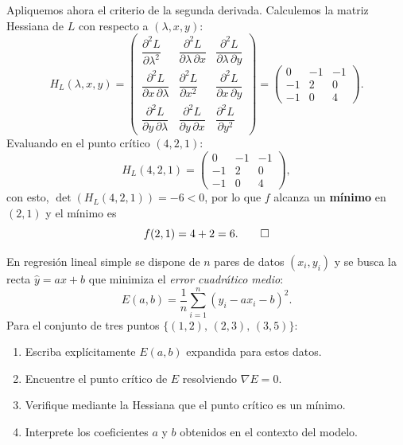 \documentclass[11pt,respuestas,a4]{aleph-examen}
\begin{document}
\begin{preguntas}
\begin{respuesta}
Apliquemos ahora el criterio de la segunda derivada. Calculemos la matriz Hessiana de $L$ con respecto a $(\lambda, x, y)$:
\[
    H_L(\lambda,x,y)
    =
    \begin{pmatrix}
        \dfrac{\partial^2 L}{\partial \lambda^2} & \dfrac{\partial^2 L}{\partial \lambda\,\partial x} & \dfrac{\partial^2 L}{\partial \lambda\,\partial y}\\[10pt]
        \dfrac{\partial^2 L}{\partial x\,\partial \lambda} & \dfrac{\partial^2 L}{\partial x^2} & \dfrac{\partial^2 L}{\partial x\,\partial y}\\[10pt]
        \dfrac{\partial^2 L}{\partial y\,\partial \lambda} & \dfrac{\partial^2 L}{\partial y\,\partial x} & \dfrac{\partial^2 L}{\partial y^2}
    \end{pmatrix}
    =
    \begin{pmatrix}
        0 & -1 & -1\\
        -1 & 2 & 0\\
        -1 & 0 & 4
    \end{pmatrix}.
\]
Evaluando en el punto crítico $(4,2,1)$:
\[
    H_L(4,2,1)
    =
    \begin{pmatrix}
        0 & -1 & -1\\
        -1 & 2 & 0\\
        -1 & 0 & 4
    \end{pmatrix},
\]
con esto, $\det(H_L(4,2,1)) = -6 < 0$, por lo que $f$ alcanza un \textbf{mínimo} en $(2,1)$ y el mínimo es
\[
    f(2,1) = 4 + 2 = 6.\qedhere
\]
\end{respuesta}


\item
En regresión lineal simple se dispone de $n$ pares de datos $(x_i, y_i)$ y se busca la recta $\hat{y} = ax + b$ que minimiza el \emph{error cuadrático medio}:
\[
    E(a,b)
    =
    \frac{1}{n}\sum_{i=1}^{n}(y_i - ax_i - b)^2.
\]
Para el conjunto de tres puntos $\{(1,2),\,(2,3),\,(3,5)\}$:
\begin{enumerate}
    \item Escriba explícitamente $E(a,b)$ expandida para estos datos.
    \item Encuentre el punto crítico de $E$ resolviendo $\nabla E = {0}$.
    \item Verifique mediante la Hessiana que el punto crítico es un mínimo.
    \item Interprete los coeficientes $a$ y $b$ obtenidos en el contexto del modelo.
\end{enumerate}


\end{preguntas}
\end{document}
